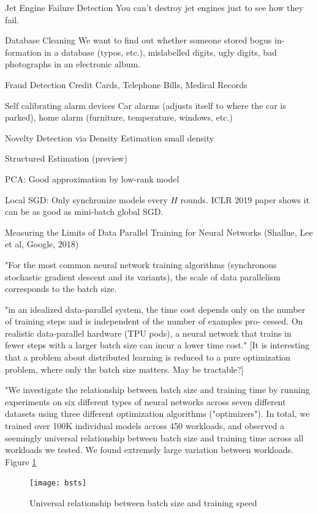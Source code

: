 \documentclass[english]{article}
\begin{document}
Jet Engine Failure Detection
You can't destroy jet engines just to see how they fail.

Database Cleaning
We want to find out whether someone stored bogus in-
formation in a database (typos, etc.), mislabelled digits,
ugly digits, bad photographs in an electronic album.

Fraud Detection
Credit Cards, Telephone Bills, Medical Records

Self calibrating alarm devices
Car alarms (adjusts itself to where the car is parked),
home alarm (furniture, temperature, windows, etc.)

Novelty Detection via Density Estimation
small density

Structured Estimation (preview)

PCA: Good approximation by low-rank model


\item Local SGD: Only synchronize models every $H$ rounds. ICLR 2019 paper shows it can be as good as mini-batch global SGD.

\item Measuring the Limits of Data Parallel Training for Neural Networks (Shallue, Lee et al, Google, 2018)

"For the most common neural network training algorithms (synchronous stochastic gradient descent and its variants), the scale of data parallelism corresponds to the batch size.

"in an idealized data-parallel system, the time cost depends
only on the number of training steps and is independent of the number of examples pro-
cessed. On realistic data-parallel hardware (TPU pods),
a neural network that trains in fewer steps with a larger batch size can incur a lower time
cost." [It is interesting that a problem about distributed learning is reduced to a pure optimization problem, where only the batch size matters. May be tractable?]

"We investigate the relationship between batch size and training time by running experiments on six different types of neural networks across seven different datasets using three different optimization algorithms ("optimizers"). In total, we trained over 100K individual models across 450 workloads, and observed a seemingly universal relationship between batch size and training time across all workloads we tested. We found extremely large variation between workloads. Figure \ref{Bsts}

\begin{figure}
\begin{center}
\texttt{[image: bsts]}
    \caption{Universal relationship between batch size and training speed}
    \label{Bsts}
\end{center}
\end{figure}
\end{document}
